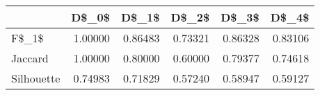 \begin{table}
\centering
\caption{}
\label{}
\begin{tabular}{lrrrrr}
\toprule
{} &   D\$\_0\$ &   D\$\_1\$ &   D\$\_2\$ &   D\$\_3\$ &   D\$\_4\$ \\
\midrule
F\$\_1\$      & 1.00000 & 0.86483 & 0.73321 & 0.86328 & 0.83106 \\
Jaccard    & 1.00000 & 0.80000 & 0.60000 & 0.79377 & 0.74618 \\
Silhouette & 0.74983 & 0.71829 & 0.57240 & 0.58947 & 0.59127 \\
\bottomrule
\end{tabular}
\end{table}

